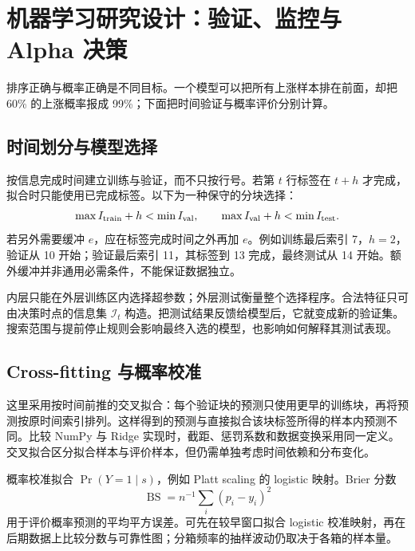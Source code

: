 \chapter{机器学习研究设计：验证、监控与 Alpha 决策}
\label{ch:lower-ml-validation}

\begin{itemize}
  
\end{itemize}

排序正确与概率正确是不同目标。一个模型可以把所有上涨样本排在前面，却把 60\% 的上涨概率报成 99\%；下面把时间验证与概率评价分别计算。


\section{时间划分与模型选择}

按信息完成时间建立训练与验证，而不只按行号。若第 $t$ 行标签在 $t+h$ 才完成，拟合时只能使用已完成标签。以下为一种保守的分块选择：
\[
 \max I_{\rm train}+h<\min I_{\rm val},\qquad
 \max I_{\rm val}+h<\min I_{\rm test}.
\]
若另外需要缓冲 $e$，应在标签完成时间之外再加 $e$。例如训练最后索引 7，$h=2$，验证从 10 开始；验证最后索引 11，其标签到 13 完成，最终测试从 14 开始。额外缓冲并非通用必需条件，不能保证数据独立。



内层只能在外层训练区内选择超参数；外层测试衡量整个选择程序。合法特征只可由决策时点的信息集 $\mathcal I_t$ 构造。把测试结果反馈给模型后，它就变成新的验证集。搜索范围与提前停止规则会影响最终入选的模型，也影响如何解释其测试表现。

\section{Cross-fitting 与概率校准}

这里采用按时间前推的交叉拟合：每个验证块的预测只使用更早的训练块，再将预测按原时间索引排列。这样得到的预测与直接拟合该块标签所得的样本内预测不同。比较 NumPy 与 Ridge 实现时，截距、惩罚系数和数据变换采用同一定义。交叉拟合区分拟合样本与评价样本，但仍需单独考虑时间依赖和分布变化。



概率校准拟合 $\Pr(Y=1\mid s)$，例如 Platt scaling 的 logistic 映射。Brier 分数
\[
\operatorname{BS}=n^{-1}\sum_i(p_i-y_i)^2
\]
用于评价概率预测的平均平方误差。可先在较早窗口拟合 logistic 校准映射，再在后期数据上比较分数与可靠性图；分箱频率的抽样波动仍取决于各箱的样本量\cite{niculescu2005probabilities}。

